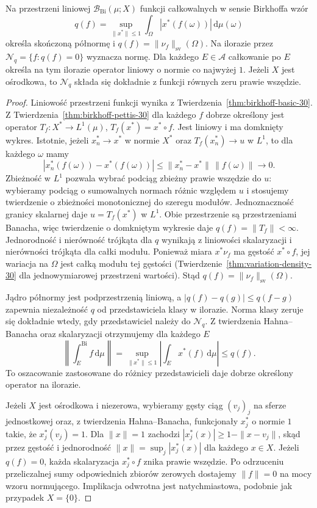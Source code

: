 \begin{twierdzenie}
\label{thm:birkhoff-seminorm-30}
Na przestrzeni liniowej $\mathcal B_{\mathrm{Bi}}(\mu;X)$
funkcji całkowalnych w sensie Birkhoffa wzór
\[
 q(f)=\sup_{\|x^*\|\le1}\int_\Omega
                 |x^*(f(\omega))|\,\mathrm d\mu(\omega)
\]
określa skończoną półnormę i
$q(f)=\|\nu_f\|_{\mathrm{sv}}(\Omega)$.
Na ilorazie przez $\mathcal N_q=\{f:q(f)=0\}$
wyznacza normę. Dla każdego $E\in\mathcal A$
całkowanie po $E$ określa na tym ilorazie
operator liniowy o normie co najwyżej $1$.
Jeżeli $X$ jest ośrodkowa, to $\mathcal N_q$
składa się dokładnie z funkcji równych zeru
prawie wszędzie.
\end{twierdzenie}
\begin{proof}
Liniowość przestrzeni funkcji wynika z
Twierdzenia~\ref{thm:birkhoff-basic-30}.
Z Twierdzenia~\ref{thm:birkhoff-pettis-30} dla
każdego $f$ dobrze określony jest operator
$T_f:X^*\to L^1(\mu)$, $T_f(x^*)=x^*\circ f$.
Jest liniowy i ma domknięty wykres. Istotnie,
jeżeli $x_n^*\to x^*$ w normie $X^*$ oraz
$T_f(x_n^*)\to u$ w $L^1$, to dla każdego $\omega$
mamy
\[
 |x_n^*(f(\omega))-x^*(f(\omega))|
 \le\|x_n^*-x^*\|\,\|f(\omega)\|\longrightarrow0.
\]
Zbieżność w $L^1$ pozwala wybrać podciąg
zbieżny prawie wszędzie do $u$: wybieramy
podciąg o sumowalnych normach różnic względem
$u$ i stosujemy twierdzenie o zbieżności
monotonicznej do szeregu modułów. Jednoznaczność
granicy skalarnej daje $u=T_f(x^*)$ w $L^1$.
Obie przestrzenie są przestrzeniami Banacha,
więc twierdzenie o domkniętym wykresie daje
$q(f)=\|T_f\|<\infty$.
Jednorodność i nierówność trójkąta dla $q$
wynikają z liniowości skalaryzacji i nierówności
trójkąta dla całki modułu.
Ponieważ miara $x^*\nu_f$ ma gęstość $x^*\circ f$,
jej wariacja na $\Omega$ jest całką modułu
tej gęstości (Twierdzenie~\ref{thm:variation-density-30}
dla jednowymiarowej przestrzeni wartości). Stąd $q(f)=\|\nu_f\|_{\mathrm{sv}}(\Omega)$.

Jądro półnormy jest podprzestrzenią liniową,
a $|q(f)-q(g)|\le q(f-g)$ zapewnia niezależność
$q$ od przedstawiciela klasy w ilorazie.
Norma klasy zeruje się dokładnie wtedy,
gdy przedstawiciel należy do $\mathcal N_q$.
Z twierdzenia Hahna--Banacha oraz skalaryzacji
otrzymujemy dla każdego $E$
\[
 \left\|\int_E^{\mathrm{Bi}} f\,\mathrm d\mu\right\|
 =\sup_{\|x^*\|\le1}
       \left|\int_E x^*(f)\,\mathrm d\mu\right|
 \le q(f).
\]
To oszacowanie zastosowane do różnicy przedstawicieli
daje dobrze określony operator na ilorazie.

Jeżeli $X$ jest ośrodkowa i niezerowa, wybieramy
gęsty ciąg $(v_j)_j$ na sferze jednostkowej
oraz, z twierdzenia Hahna--Banacha, funkcjonały
$x_j^*$ o normie $1$ takie, że $x_j^*(v_j)=1$.
Dla $\|x\|=1$ zachodzi
$|x_j^*(x)|\ge1-\|x-v_j\|$, skąd przez gęstość
i jednorodność
$\|x\|=\sup_j|x_j^*(x)|$ dla każdego $x\in X$.
Jeżeli $q(f)=0$, każda skalaryzacja $x_j^*\circ f$
znika prawie wszędzie. Po odrzuceniu przeliczalnej
sumy odpowiednich zbiorów zerowych dostajemy
$\|f\|=0$ na mocy wzoru normującego.
Implikacja odwrotna jest natychmiastowa,
podobnie jak przypadek $X=\{0\}$.
\end{proof}


